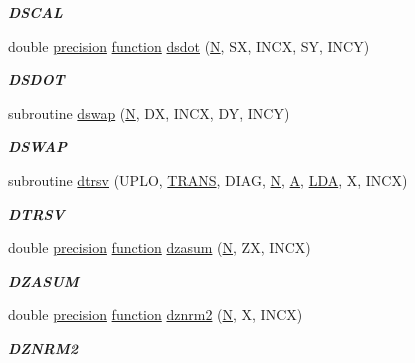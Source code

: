 \begin{DoxyCompactItemize}
\begin{DoxyCompactList}\small\item\em {\bfseries D\+S\+C\+A\+L} \end{DoxyCompactList}\item 
double \hyperlink{numinquire_8h_a2c8e616467665d0b2814d4c1589ba74e}{precision} \hyperlink{afunc_8m_a7b5e596df91eadea6c537c0825e894a7}{function} \hyperlink{group__double__blas__level1_ga32d6fccb43cb13feafc23825f2685ba0}{dsdot} (\hyperlink{polmisc_8c_a0240ac851181b84ac374872dc5434ee4}{N}, S\+X, I\+N\+C\+X, S\+Y, I\+N\+C\+Y)
\begin{DoxyCompactList}\small\item\em {\bfseries D\+S\+D\+O\+T} \end{DoxyCompactList}\item 
subroutine \hyperlink{group__double__blas__level1_gaca2757ba2c3b2c6fc5d729b50345fac0}{dswap} (\hyperlink{polmisc_8c_a0240ac851181b84ac374872dc5434ee4}{N}, D\+X, I\+N\+C\+X, D\+Y, I\+N\+C\+Y)
\begin{DoxyCompactList}\small\item\em {\bfseries D\+S\+W\+A\+P} \end{DoxyCompactList}\item 
subroutine \hyperlink{group__double__blas__level1_gad2a01dd62718b28e35b752dbad8474ab}{dtrsv} (U\+P\+L\+O, \hyperlink{superlu__enum__consts_8h_a0c4e17b2d5cea33f9991ccc6a6678d62a1f61e3015bfe0f0c2c3fda4c5a0cdf58}{T\+R\+A\+N\+S}, D\+I\+A\+G, \hyperlink{polmisc_8c_a0240ac851181b84ac374872dc5434ee4}{N}, \hyperlink{classA}{A}, \hyperlink{example__user_8c_ae946da542ce0db94dced19b2ecefd1aa}{L\+D\+A}, X, I\+N\+C\+X)
\begin{DoxyCompactList}\small\item\em {\bfseries D\+T\+R\+S\+V} \end{DoxyCompactList}\item 
double \hyperlink{numinquire_8h_a2c8e616467665d0b2814d4c1589ba74e}{precision} \hyperlink{afunc_8m_a7b5e596df91eadea6c537c0825e894a7}{function} \hyperlink{group__double__blas__level1_ga60d5c8001b317c929778670a15013eb4}{dzasum} (\hyperlink{polmisc_8c_a0240ac851181b84ac374872dc5434ee4}{N}, Z\+X, I\+N\+C\+X)
\begin{DoxyCompactList}\small\item\em {\bfseries D\+Z\+A\+S\+U\+M} \end{DoxyCompactList}\item 
double \hyperlink{numinquire_8h_a2c8e616467665d0b2814d4c1589ba74e}{precision} \hyperlink{afunc_8m_a7b5e596df91eadea6c537c0825e894a7}{function} \hyperlink{group__double__blas__level1_ga969fee86423deeced6013320c9b35b28}{dznrm2} (\hyperlink{polmisc_8c_a0240ac851181b84ac374872dc5434ee4}{N}, X, I\+N\+C\+X)
\begin{DoxyCompactList}\small\item\em {\bfseries D\+Z\+N\+R\+M2} \end{DoxyCompactList}\end{DoxyCompactItemize}


